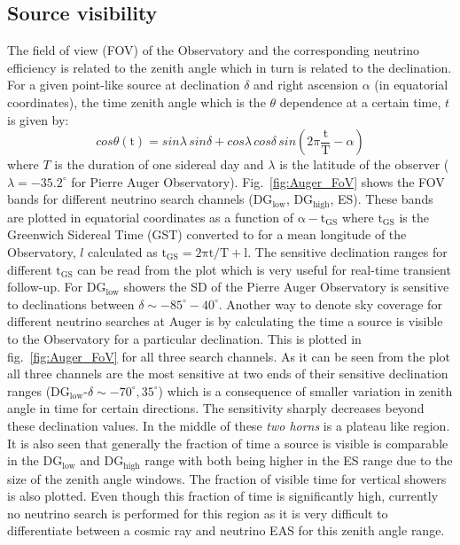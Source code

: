 \subsection{Source visibility}
\label{subsec:psource_coverage}
The field of view (FOV) of the Observatory and the corresponding neutrino efficiency is related to the zenith angle which in turn is related to the declination. For a given point-like source at declination $\delta$ and right ascension $\alpha$ (in equatorial coordinates), the time zenith angle which is the $\theta$ dependence at a certain time, $t$ is given by:
\begin{equation}
  \label{eq:zenith_angle_time}
  cos \theta(\text{t}) = sin \lambda \,sin \delta+ cos \lambda \, cos \delta \,sin (2\pi \frac{\text{t}}{\text{T}} - \alpha)
\end{equation} 
where $T$ is the duration of one sidereal day and $\lambda$ is the latitude of the observer ($\lambda = -35.2^{\circ}$ for Pierre Auger Observatory). 
Fig.~\ref{fig:Auger_FoV} shows the FOV bands for different neutrino search channels (DG$\mathrm{_{low}}$, DG$\mathrm{_{high}}$, ES). These bands are plotted in equatorial coordinates as a function of $\mathrm{\alpha - t _{GS}}$ where $\mathrm{t_{GS}}$ is the Greenwich Sidereal Time (GST) converted to for a mean longitude of the Observatory, $l$ calculated as $\mathrm{t_{GS}= 2\pi t/T + l}$. The sensitive declination ranges for different $\mathrm{t_{GS}}$ can be read from the plot which is very useful for real-time transient follow-up. For DG$\mathrm{_{low}}$ showers the SD of the Pierre Auger Observatory is sensitive to declinations between $\delta \sim -85^{\circ} - 40^{\circ}$. Another way to denote sky coverage for different neutrino searches at Auger is by calculating the time a source is visible to the Observatory for a particular declination. This is plotted in fig.~\ref{fig:Auger_FoV} for all three search channels. As it can be seen from the plot all three channels are the most sensitive at two ends of their sensitive declination ranges (DG$\mathrm{_{low}}$-$\delta \sim -70^{\circ}, 35^{\circ}$) which is a consequence of smaller variation in zenith angle in time for certain directions. The sensitivity sharply decreases beyond these declination values. In the middle of these \textit{two horns} is a plateau like region. It is also seen that generally the fraction of time a source is visible is comparable in the DG$\mathrm{_{low}}$ and DG$\mathrm{_{high}}$ range with both being higher in the ES range due to the size of the zenith angle windows. The fraction of visible time for vertical showers is also plotted. Even though this fraction of time is significantly high, currently no neutrino search is performed for this region as it is very difficult to differentiate between a cosmic ray and neutrino EAS for this zenith angle range.

